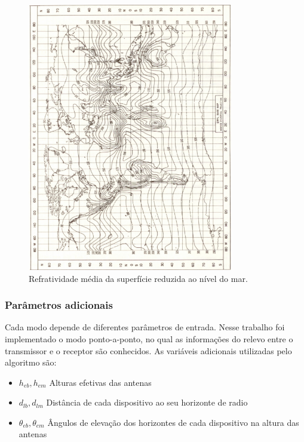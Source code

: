 \begin{figure}[nsmap]
\centering
\includegraphics[width=0.8\textwidth]{figs/nsmap}
\caption[Refratividade média da superfície reduzida ao nível do mar.]
{Refratividade média da superfície reduzida ao nível do mar.}
\label{fig:nsmap}
\end{figure}

\subsubsection{Parâmetros adicionais}

Cada modo depende de diferentes parâmetros de entrada. Nesse trabalho foi implementado o modo ponto-a-ponto, no qual as informações do relevo entre o transmissor e o receptor são conhecidos.  
As variáveis adicionais utilizadas pelo algoritmo são:

\begin{itemize}
\item \begin{math}h_{eb}, h_{em}\end{math} Alturas efetivas das antenas
\item \begin{math}d_{lb},d_{lm}\end{math} Distância de cada dispositivo ao seu horizonte de radio
\item \begin{math}\theta_{eb}, \theta_{em}\end{math} Ângulos de elevação dos horizontes de cada dispositivo na altura das antenas
\end{itemize}

